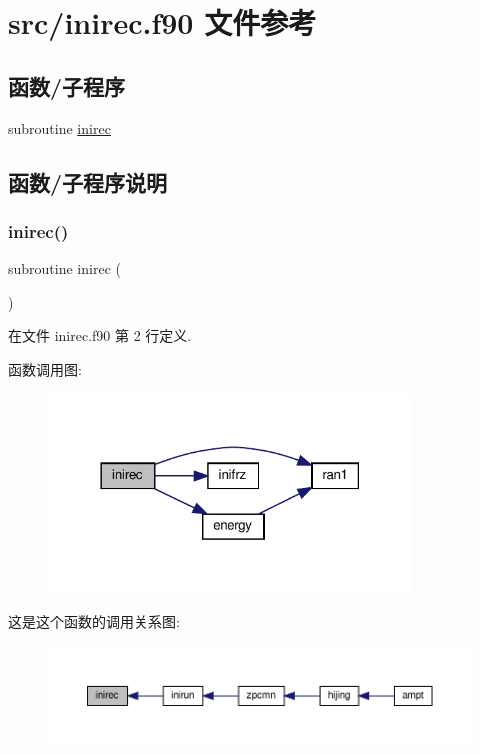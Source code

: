 \hypertarget{inirec_8f90}{}\section{src/inirec.f90 文件参考}
\label{inirec_8f90}
\subsection*{函数/子程序}
\begin{DoxyCompactItemize}
\item 
subroutine \mbox{\hyperlink{inirec_8f90_a356f8edff2f603f6be24cbbb961620d0}{inirec}}
\end{DoxyCompactItemize}


\subsection{函数/子程序说明}
\mbox{\label{inirec_8f90_a356f8edff2f603f6be24cbbb961620d0}} 
\subsubsection{\texorpdfstring{inirec()}{inirec()}}
{\footnotesize\ttfamily subroutine inirec (\begin{DoxyParamCaption}{ }\end{DoxyParamCaption})}



在文件 inirec.\+f90 第 2 行定义.

函数调用图\+:
\nopagebreak
\begin{figure}[H]
\begin{center}
\leavevmode
\includegraphics[width=273pt]{inirec_8f90_a356f8edff2f603f6be24cbbb961620d0_cgraph}
\end{center}
\end{figure}
这是这个函数的调用关系图\+:
\nopagebreak
\begin{figure}[H]
\begin{center}
\leavevmode
\includegraphics[width=350pt]{inirec_8f90_a356f8edff2f603f6be24cbbb961620d0_icgraph}
\end{center}
\end{figure}
